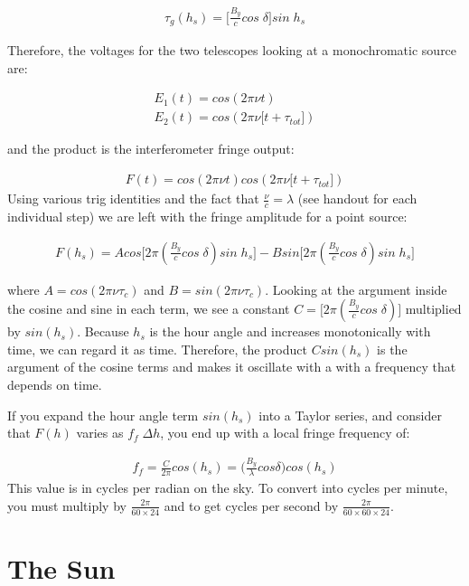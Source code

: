 \documentclass{article}
\begin{document}
\singlespacing
\begin{eqnarray}
 \tau_{g}(h_s) =\bigg[ \frac{B_y}{c}cos\;\delta \bigg] sin\;h_s
\end{eqnarray}

Therefore, the voltages for the two telescopes looking at a monochromatic source are: 

\begin{eqnarray}
 E_1(t) =cos(2\pi\nu t) \\
 E_2(t) =cos(2\pi\nu \big[ t+\tau_{tot}\big])
\end{eqnarray}

and the product is the interferometer fringe output:

\begin{eqnarray}
 F(t) =cos(2\pi\nu t) cos(2\pi\nu \big[ t+\tau_{tot}\big])
\end{eqnarray}
\doublespacing
Using various trig identities and the fact that $\frac{\nu}{c} = \lambda$ (see handout for each individual step) we are left with the fringe amplitude for a point source:


\begin{eqnarray}
 F(h_s) =Acos\bigg[ 2\pi(\frac{B_y}{c}cos\;\delta)sin\;h_s \bigg] -Bsin\bigg[ 2\pi(\frac{B_y}{c}cos\;\delta)sin\;h_s \bigg]
\label{eq:lss}
\end{eqnarray}

where  $A = cos(2\pi\nu\tau_c)$ and $B = sin(2\pi\nu\tau_c)$. Looking at the argument inside the cosine and sine in each term, we see a constant $C = \bigg[2\pi( \frac{B_y}{c}cos\;\delta )\bigg]$ multiplied by $sin(h_s)$. Because $h_s$ is the hour angle and increases monotonically with time, we can regard it as time. Therefore, the product $C sin(h_s)$ is the argument of the cosine terms and makes it oscillate with a with a frequency that depends on time. 

If you expand the hour angle term $sin(h_s)$ into a Taylor series, and consider that $F(h)$ varies as $f_f \;\Delta h$, you end up with a local fringe frequency of:

\begin{eqnarray}
f_f = \frac{C}{2\pi}cos(h_s)= \bigg(\frac{B_y}{\lambda}cos\delta \bigg) cos(h_s)
\label{eq:ff}
\end{eqnarray}
This value is in cycles per radian on the sky. To convert into cycles per minute, you must multiply by $\frac{2\pi}{60\times24}$ and to get cycles per second by $\frac{2\pi}{60\times60\times24}$.

\section{The Sun}
 
\end{document}
